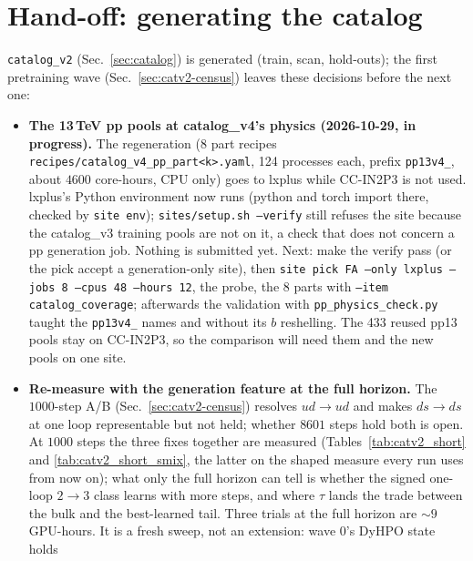 \documentclass[11pt]{article}
\newcommand{\code}[1]{\texttt{#1}}
\begin{document}
\section{Hand-off: generating the catalog}\label{sec:catalog-open}
\code{catalog\_v2} (Sec.~\ref{sec:catalog}) is generated (train, scan, hold-outs); the first
pretraining wave (Sec.~\ref{sec:catv2-census}) leaves these decisions before the next one:
\begin{itemize}
  \item \textbf{The 13\,TeV pp pools at catalog\_v4's physics (2026-10-29, in progress).} The regeneration
    (8 part recipes \code{recipes/catalog\_v4\_pp\_part<k>.yaml}, 124 processes each, prefix \code{pp13v4\_},
    about $4600$ core-hours, CPU only) goes to lxplus while CC-IN2P3 is not used. lxplus's Python environment now
    runs (python and torch import there, checked by \code{site env}); \code{sites/setup.sh --verify} still refuses the
    site because the catalog\_v3 training pools are not on it, a check that does not concern a pp generation job.
    Nothing is submitted yet. Next: make the verify pass (or the pick accept a generation-only site), then
    \code{site pick FA --only lxplus --jobs 8 --cpus 48 --hours 12}, the probe, the 8 parts with
    \code{--item catalog\_coverage}; afterwards the validation with \code{pp\_physics\_check.py} taught the
    \code{pp13v4\_} names and without its $b$ reshelling. The 433 reused pp13 pools stay on CC-IN2P3, so the
    comparison will need them and the new pools on one site.
  \item \textbf{Re-measure with the generation feature at the full horizon.} The
    $1000$-step A/B (Sec.~\ref{sec:catv2-census}) resolves $ud\to ud$ and makes $ds\to ds$
    at one loop representable but not held; whether $8601$ steps hold both is open. At
    $1000$ steps the three fixes together are measured (Tables~\ref{tab:catv2_short} and
    \ref{tab:catv2_short_smix}, the latter on the shaped measure every run uses from now on); what
    only the full horizon can tell is whether the signed one-loop $2\to3$ class learns with
    more steps, and where $\tau$ lands the trade between the bulk and the best-learned tail. Three
    trials at the full horizon are $\sim9$ GPU-hours. It is a fresh sweep, not an extension: wave 0's DyHPO state holds

\end{itemize}
\end{document}
